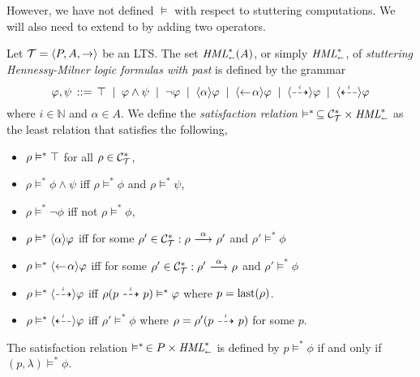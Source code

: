 However, we have not defined $\vDash$ with respect to stuttering computations.
We will also need to extend \HMLpast{} to \HMLpp by adding
two operators.

\begin{definition}
    \label{dfn:hmlpast}
    Let $\mathcal{T}=\langle P,A,\rightarrow \rangle$ be an LTS. The set $\textit{HML}_\shortleftarrow^*(A)$,
    or simply $\textit{HML}_\shortleftarrow^*$, of
    \emph{stuttering Hennessy-Milner logic formulas with past}
    is defined by the grammar
    \[
        \varphi,\psi \,::=\, \top \;\;|\;\; \varphi\land\psi
                                \;\;|\;\; \neg\varphi
                                \;\;|\;\; \mbox{\ensuremath{\langle \alpha \rangle}} \varphi
                                \;\;|\;\; \mbox{\ensuremath{\langle\leftarrow\! \alpha \rangle}} \varphi
                                \;\;|\;\; \mbox{\ensuremath{\langle\stackrel{_{i}}{\dashrightarrow}\rangle}} \varphi
                                \;\;|\;\; \mbox{\ensuremath{\langle\stackrel{_{i}}{\dashleftarrow}\rangle}} \varphi
    \]
    where $i\in\mathbb{N}$ and $\alpha\in A$.
    We define the \emph{satisfaction relation} $\vDash^*\,\subseteq \mathcal{C}_{\mathcal{T}}^* \times \textit{HML}_\shortleftarrow^*$
    as the least relation that satisfies the following,
    \begin{itemize}
        \item $\rho\vDash^*\top$ for all $\rho\in\mathcal{C}_{\mathcal{T}}^*$,
        \item $\rho\vDash^*\phi\land\psi$ iff $\rho\vDash^*\phi$ and $\rho\vDash^*\psi$,
        \item $\rho\vDash^*\neg\phi$ iff not $\rho\vDash^*\phi$,
        \item $\rho\vDash^*\mbox{\ensuremath{\langle \alpha \rangle}}\varphi$ iff for some
              $\rho'\in\mathcal{C}_{\mathcal{T}}^* : \rho\ {\stackrel{{\alpha}}{\longrightarrow}}\ \rho'$ and $\rho'\vDash^*\phi$
        \item $\rho\vDash^*\mbox{\ensuremath{\langle\leftarrow\! \alpha \rangle}}\varphi$ iff for some
              $\rho'\in\mathcal{C}_{\mathcal{T}}^* : \rho'\ {\stackrel{{\alpha}}{\longrightarrow}}\ \rho$ and $\rho'\vDash^*\phi$
        \item $\rho\vDash^*\mbox{\ensuremath{\langle\stackrel{_{i}}{\dashrightarrow}\rangle}}\varphi$ iff
              $\rho(p\ {\stackrel{_{i}}{\dashrightarrow}}\  p) \vDash^* \varphi$ where $p=\operatorname{last}(\rho)$.
        \item $\rho\vDash^*\mbox{\ensuremath{\langle\stackrel{_{i}}{\dashleftarrow}\rangle}}\varphi$ iff
              $\rho' \vDash^* \phi$ where $\rho = \rho'(p \ {\stackrel{_{i}}{\dashrightarrow}}\  p)$ for some $p$.
    \end{itemize}
    The satisfaction relation $\vDash^*\,\in P\times\textit{HML}_\shortleftarrow^*$ is defined by
    $p\vDash^*\phi$ if and only if $(p,\lambda)\vDash^* \phi$.
\end{definition}

